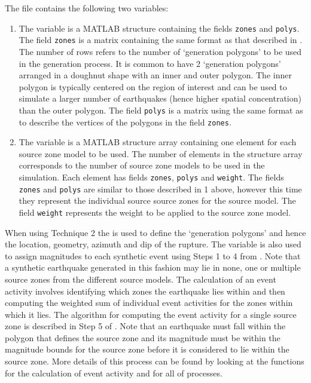 The  file contains
the following two variables:
\begin{enumerate}
\item The  variable is a MATLAB structure
containing the fields \texttt{zones} and \texttt{polys}. The field
\texttt{zones} is a matrix containing the same format as that
described in . The number of
rows refers to the number of `generation polygons' to be used in
the generation process. It is common to have 2 `generation
polygons' arranged in a doughnut shape with an inner and outer
polygon. The inner polygon is typically centered on the region of
interest and can be used to simulate a larger number of
earthquakes (hence higher spatial concentration) than the outer
polygon. The field \texttt{polys} is a matrix using the same
format as  to describe the
vertices of the polygons in the field \texttt{zones}. \item The
 variable is a MATLAB structure array
containing one element for each source zone model to be used. The
number of elements in the  structure array
corresponds to the number of source zone models to be used in the
simulation. Each element has fields \texttt{zones}, \texttt{polys}
and \texttt{weight}. The fields \texttt{zones} and \texttt{polys}
are similar to those described in 1 above, however this time they
represent the individual source source zones for the source model.
The field \texttt{weight} represents the weight to be applied to
the source zone model.
\end{enumerate}

When using Technique 2 the  is used to
define the `generation polygons' and hence the location, geometry,
azimuth and dip of the rupture. The variable
 is also used to assign magnitudes to each
synthetic event using Steps 1 to 4 from
. Note that a synthetic earthquake
generated in this fashion may lie in none, one or multiple source
zones from the different source models. The calculation of an
event activity involves identifying which zones the earthquake
lies within and then computing the weighted sum of individual
event activities for the zones within which it lies. The algorithm
for computing the event activity for a single source zone is
described in Step 5 of . Note that
an earthquake must fall within the polygon that defines the source
zone and its magnitude must be within the magnitude bounds for the
source zone before it is considered to lie within the source zone.
More details of this process can be found by looking at the
functions  for the calculation
of event activity and  for all of
processes.


